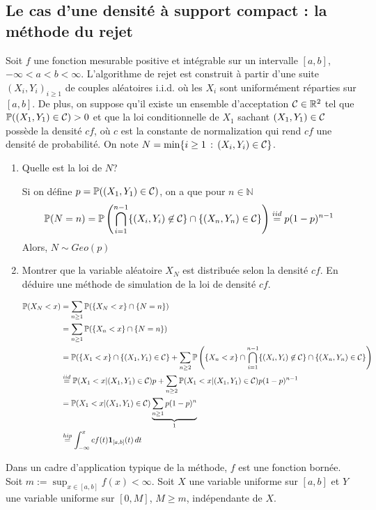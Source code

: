 \documentclass[a4paper]{article}
\begin{document}
\subsection{Le cas d'une densit\'e \`a support compact : la m\'ethode du rejet}

Soit $f$ une fonction mesurable positive et int\'egrable sur un intervalle $[a,b]$, $-\infty<a<b<\infty$. L'algorithme de rejet est construit \`a partir d'une suite $(X_i,Y_i)_{i\geq1}$ de couples al\'eatoires i.i.d. o\`u les $X_i$ sont uniform\'ement r\'eparties sur $[a,b]$. De plus, on suppose qu'il existe un ensemble d'acceptation ${\cal C}\in \mathbb{R}^2$ tel que $\mathbb{P}((X_1,Y_1)\in {\cal C})>0$ et que la loi conditionnelle de $X_1$ sachant $(X_1,Y_1)\in{\cal C}$ poss\`ede la densit\'e $cf$, o\`u $c$ est la constante de normalization qui rend $cf$ une densit\'e de probabilit\'e. On note $N = \min\{i\geq1\,:\,(X_i,Y_i)\in{\cal C}\}$.

\begin{enumerate}
\item Quelle est la loi de $N$?

Si on d\'efine $p = \mathbb{P}((X_1,Y_1)\in{\cal C})$, on a que pour $n\in\mathbb{N}$
$$\mathbb{P}(N=n) = \mathbb{P}\left(\bigcap\limits_{i=1}^{n-1}\{(X_i,Y_i)\not\in{\cal C}\}\cap \{(X_n,Y_n)\in{\cal C}\}\right) \stackrel{iid}{=} p(1-p)^{n-1}$$
Alors, $N\sim Geo(p)$


\item Montrer que la variable al\'eatoire $X_N$ est distribu\'ee selon la densit\'e $cf$. En d\'eduire une m\'ethode de simulation de la loi de densit\'e $cf$.

\begin{align*}
\mathbb{P}(X_N<x) &= \sum\limits_{n\geq1}\mathbb{P}(\{X_N<x\} \cap \{N=n\})\\&= \sum\limits_{n\geq1}\mathbb{P}(\{X_n<x\} \cap \{N=n\})\\&= \mathbb{P}(\{X_1<x\}\cap\{(X_1,Y_1)\in{\cal C}\} + \sum\limits_{n\geq2}\mathbb{P}\left(\{X_n<x\} \cap \bigcap\limits_{i=1}^{n-1}\{(X_i,Y_i)\not\in{\cal C}\}\cap\{(X_n,Y_n)\in{\cal C}\}\right)\\&\stackrel{iid}{=}\mathbb{P}(X_1<x|(X_1,Y_1)\in{\cal C})p + \sum\limits_{n\geq2}\mathbb{P}(X_1<x|(X_1,Y_1)\in{\cal C})p(1-p)^{n-1}\\&= \mathbb{P}(X_1<x|(X_1,Y_1)\in{\cal C})\underbrace{\sum\limits_{n\geq1}p(1-p)^n}_{1}\\&\stackrel{hip}{=}\int_{-\infty}^x cf(t)\mathbf{1}_{[a,b]}(t)\,dt
\end{align*}



\end{enumerate}
Dans un cadre d'application typique de la m\'ethode, $f$ est une fonction born\'ee. Soit $m:=\sup_{x\in[a,b]}f(x)<\infty$. Soit $X$ une variable uniforme sur $[a,b]$ et $Y$ une variable uniforme sur $[0,M]$, $M\geq m$, ind\'ependante de $X$.
\end{document}
